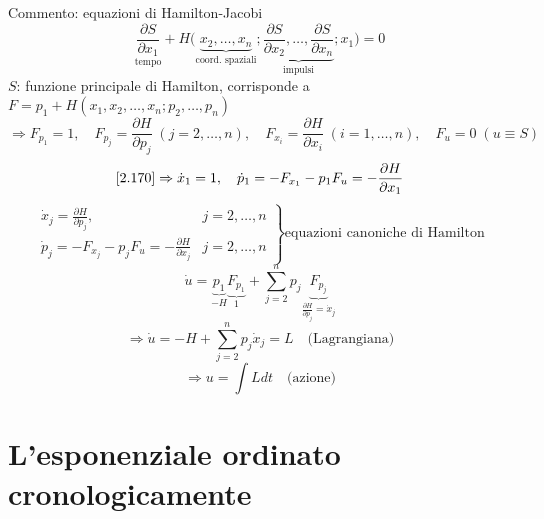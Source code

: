 \documentclass[a4paper,11pt]{report}
\begin{document}
Commento: equazioni di Hamilton-Jacobi
\[
\underset{\text{tempo}}{\frac{\partial S}{\partial x_1}}+H \Big(\underbrace{x_2,\dots,x_n}_\text{coord. spaziali}; \underbrace{\frac{\partial S}{\partial x_2}, \dots,\frac{\partial S}{\partial x_n}}_\text{impulsi}; x_1 \Big)=0
\]
$S$: funzione principale di Hamilton, corrisponde a $F= p_1 + H(x_1,x_2,\dots,x_n;p_2,\dots,p_n)$
\[
\Rightarrow F_{p_1}=1,\quad F_{p_j}=\frac{\partial H}{\partial p_j} \; (j=2,\dots,n), \quad F_{x_i}=\frac{\partial H}{\partial x_i} \; (i=1,\dots,n), \quad F_u=0 \; (u\equiv S)
\]
\[
\eqref{2.170} \Rightarrow \dot{x}_1=1,\quad \dot{p}_1=-F_{x_1}-p_1F_u = -\frac{\partial H}{\partial x_1}
\]
\[
\left.\begin{matrix}
\dot{x}_j=\frac{\partial H}{\partial p_j}, & j=2,\dots,n \\
\dot{p}_j=-F_{x_j}-p_jF_u=-\frac{\partial H}{\partial x_j} & j=2,\dots,n
\end{matrix}\right\} \text{equazioni canoniche di Hamilton}
\]
\[
\dot{u}=\underbrace{p_1}_{-H} \underbrace{F_{p_1}}_{1} + \sum_{j=2}^n p_j \underbrace{F_{p_j}}_{\frac{\partial H}{\partial p_j}=\dot{x}_j}
\]
\[
\Rightarrow \dot{u}=-H + \sum_{j=2}^n p_j\dot{x}_j=L \quad \text{(Lagrangiana)}
\]
\[
\Rightarrow u=\int L dt \quad \text{(azione)}
\]

\section{L'esponenziale ordinato cronologicamente}
\end{document}
